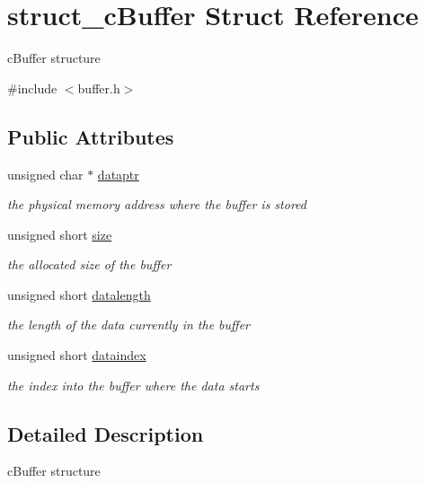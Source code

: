 \hypertarget{structstruct__c_buffer}{\section{struct\-\_\-c\-Buffer Struct Reference}
\label{structstruct__c_buffer}
}


c\-Buffer structure  




{\ttfamily \#include $<$buffer.\-h$>$}

\subsection*{Public Attributes}
\begin{DoxyCompactItemize}
\item 
unsigned char $\ast$ \hyperlink{structstruct__c_buffer_ac5d0be464bcb156e014d1f6e5ad63330}{dataptr}
\begin{DoxyCompactList}\small\item\em the physical memory address where the buffer is stored \end{DoxyCompactList}\item 
unsigned short \hyperlink{structstruct__c_buffer_a80e300447a52eb0b66fd4d754aeb9b1c}{size}
\begin{DoxyCompactList}\small\item\em the allocated size of the buffer \end{DoxyCompactList}\item 
unsigned short \hyperlink{structstruct__c_buffer_ace222cd69a1c185a47f0922c4c626bbd}{datalength}
\begin{DoxyCompactList}\small\item\em the length of the data currently in the buffer \end{DoxyCompactList}\item 
unsigned short \hyperlink{structstruct__c_buffer_a7e8a4fbfa270d36207de44b2ed5e7c8c}{dataindex}
\begin{DoxyCompactList}\small\item\em the index into the buffer where the data starts \end{DoxyCompactList}\end{DoxyCompactItemize}


\subsection{Detailed Description}
c\-Buffer structure 

